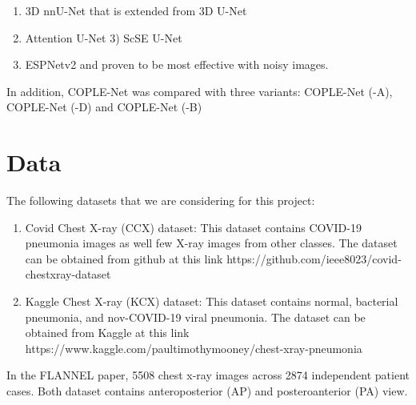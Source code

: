 \documentclass{sigkddExp}
\begin{document}
\begin{enumerate}
       \item 3D nnU-Net that is extended from 3D U-Net
       \item Attention U-Net 3) ScSE U-Net
       \item ESPNetv2 and proven to be most effective with noisy images.
\end{enumerate}

In addition, COPLE-Net was compared with three variants: COPLE-Net (-A), COPLE-Net (-D)
and COPLE-Net (-B) 

%

\section{Data}

The following datasets that we are considering for this project:
\begin{enumerate}
       
\item Covid Chest X-ray (CCX) dataset: This dataset contains COVID-19 pneumonia images 
as well few X-ray images from other classes. The dataset can be obtained from 
github at this link   
https://github.com/ieee8023/covid-chestxray-dataset

\item Kaggle Chest X-ray (KCX) dataset: This dataset contains normal, bacterial pneumonia, 
and nov-COVID-19 viral pneumonia. The dataset can be obtained from Kaggle at this 
link
https://www.kaggle.com/paultimothymooney/chest-xray-pneumonia
\end{enumerate}


In the FLANNEL paper, 5508 chest x-ray images across 2874 independent patient cases. Both dataset contains anteroposterior (AP) and posteroanterior (PA) view.
\end{document}

